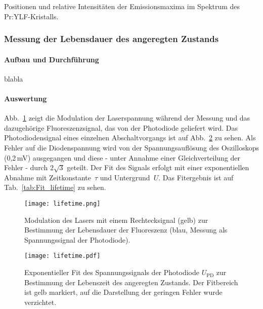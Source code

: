 \begin{table}[htb]
\caption{Positionen und relative Intensitäten der Emissionsmaxima im Spektrum des
Pr:YLF-Kristalls.}

\label{tab:EmSpec}
\end{table}


\FloatBarrier


\subsubsection{Messung der Lebensdauer des angeregten Zustands}

\paragraph{Aufbau und Durchführung}

blabla

\paragraph{Auswertung}
Abb.~\ref{img:Lifetime} zeigt die Modulation der Laserspannung während der Messung und das
dazugehörige Fluoreszenzsignal, das von der Photodiode geliefert wird.
Das Photodiodensignal eines einzelnen Abschaltvorgangs ist auf Abb.~\ref{img:LifetimeFit} zu sehen. 
Als Fehler auf die Diodenspannung wird von der Spannungsauflösung des Oszilloskops
(0,2\,mV) ausgegangen und diese - unter Annahme einer Gleichverteilung der Fehler - durch
$2\sqrt{3}$ geteilt.
Der Fit des Signals erfolgt mit einer exponentiellen Abnahme mit Zeitkonstante~$\tau$ und
Untergrund~$U$. Das Fitergebnis ist auf Tab.~\ref{tab:Fit_lifetime} zu sehen.


\begin{figure}[H]
\begin{center}
  \texttt{[image: lifetime.png]}
  \caption{Modulation des Lasers mit einem Rechtecksignal (gelb) zur Bestimmung der Lebensdauer der
  Fluoreszenz (blau, Messung als Spannungssignal der Photodiode).}
  \label{img:Lifetime}
\end{center}
\end{figure}


\begin{figure}[H]
\begin{center}
  \texttt{[image: lifetime.pdf]}
  \caption{Exponentieller Fit des Spannungssignals der Photodiode $U_{\text{PD}}$ zur Bestimmung der
  Lebenszeit des angeregten Zustands. Der Fitbereich ist gelb markiert, auf die Darstellung der geringen Fehler
  wurde verzichtet.}
  \label{img:LifetimeFit}
\end{center}
\end{figure}

